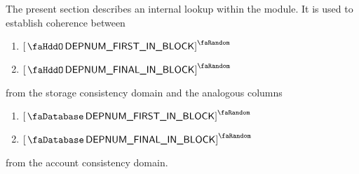 The present section describes an internal lookup within the \hubMod{} module.
It is used to establish coherence between
\begin{multicols}{2}
	\begin{enumerate}
		\item $\order{\stoDeploymentNumberFirstInBlock}$
		\item $\order{\stoDeploymentNumberFinalInBlock}$
	\end{enumerate}
\end{multicols}
\noindent from the storage consistency domain and the analogous columns
\begin{multicols}{2}
	\begin{enumerate}
		\item $\order{\accDeploymentNumberFirstInBlock}$
		\item $\order{\accDeploymentNumberFinalInBlock}$
	\end{enumerate}
\end{multicols}
\noindent from the account consistency domain.

